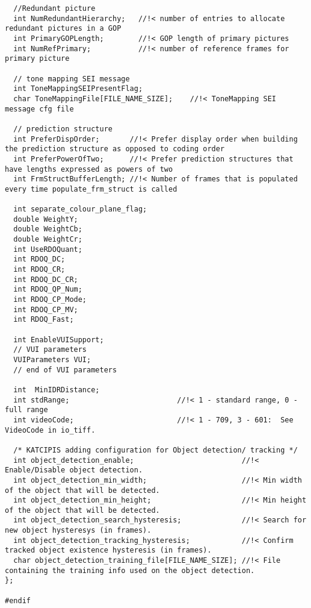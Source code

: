 \begin{lstlisting}
  //Redundant picture
  int NumRedundantHierarchy;   //!< number of entries to allocate redundant pictures in a GOP
  int PrimaryGOPLength;        //!< GOP length of primary pictures
  int NumRefPrimary;           //!< number of reference frames for primary picture

  // tone mapping SEI message
  int ToneMappingSEIPresentFlag;
  char ToneMappingFile[FILE_NAME_SIZE];    //!< ToneMapping SEI message cfg file

  // prediction structure
  int PreferDispOrder;       //!< Prefer display order when building the prediction structure as opposed to coding order
  int PreferPowerOfTwo;      //!< Prefer prediction structures that have lengths expressed as powers of two
  int FrmStructBufferLength; //!< Number of frames that is populated every time populate_frm_struct is called

  int separate_colour_plane_flag;
  double WeightY;
  double WeightCb;
  double WeightCr;
  int UseRDOQuant;
  int RDOQ_DC;
  int RDOQ_CR;
  int RDOQ_DC_CR; 
  int RDOQ_QP_Num;
  int RDOQ_CP_Mode;
  int RDOQ_CP_MV;
  int RDOQ_Fast;

  int EnableVUISupport;
  // VUI parameters
  VUIParameters VUI;
  // end of VUI parameters

  int  MinIDRDistance;
  int stdRange;                         //!< 1 - standard range, 0 - full range
  int videoCode;                        //!< 1 - 709, 3 - 601:  See VideoCode in io_tiff.

  /* KATCIPIS adding configuration for Object detection/ tracking */
  int object_detection_enable;                         //!< Enable/Disable object detection.
  int object_detection_min_width;                      //!< Min width of the object that will be detected.
  int object_detection_min_height;                     //!< Min height of the object that will be detected.
  int object_detection_search_hysteresis;              //!< Search for new object hysteresys (in frames).
  int object_detection_tracking_hysteresis;            //!< Confirm tracked object existence hysteresis (in frames).
  char object_detection_training_file[FILE_NAME_SIZE]; //!< File containing the training info used on the object detection.
};

#endif


\end{lstlisting}
